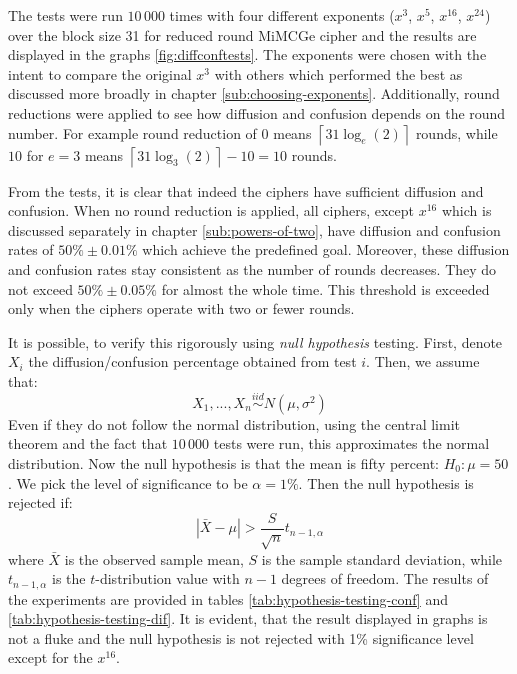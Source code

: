 \documentclass{Resources/UoBLab1}
\theoremstyle{definition}
\begin{document}
The tests were run $10\,000$ times with four different exponents ($x^3$, $x^5$, $x^{16}$, $x^{24}$) over the block size 31 for reduced round MiMCGe cipher and the results are displayed in the graphs \ref{fig:diffconftests}. The exponents were chosen with the intent to compare the original $x^3$ with others which performed the best as discussed more broadly in chapter \ref{sub:choosing-exponents}. Additionally, round reductions were applied to see how diffusion and confusion depends on the round number. For example round reduction of $0$ means $\left\lceil 31\log_e(2) \right\rceil$ rounds, while $10$ for $e = 3$ means \(\left\lceil 31\log_3(2) \right\rceil - 10 = 10\) rounds.

From the tests, it is clear that indeed the ciphers have sufficient diffusion and confusion. When no round reduction is applied, all ciphers, except $x^{16}$ which is discussed separately in chapter \ref{sub:powers-of-two}, have diffusion and confusion rates of $50\% \pm 0.01\%$ which achieve the predefined goal. Moreover, these diffusion and confusion rates stay consistent as the number of rounds decreases. They do not exceed $50\% \pm 0.05\%$ for almost the whole time. This threshold is exceeded only when the ciphers operate with two or fewer rounds.

It is possible, to verify this rigorously using \textit{null hypothesis} testing. First, denote $X_i$ the diffusion/confusion percentage obtained from test $i$. Then, we assume that:
\[
    X_1, ..., X_n \overset{iid}{\sim} N(\mu, \sigma^2)
\]
Even if they do not follow the normal distribution, using the central limit theorem and the fact that $10\,000$ tests were run, this approximates the normal distribution. Now the null hypothesis is that the mean is fifty percent: $H_0: \mu = 50$. We pick the level of significance to be $\alpha = 1\%$. Then the null hypothesis is rejected if:
\[
    |\bar{X} - \mu| > \frac{S}{\sqrt{n}}t_{n-1,\alpha}
\]
where $\bar{X}$ is the observed sample mean, $S$ is the sample standard deviation, while $t_{n-1,\alpha}$ is the $t$-distribution value with $n-1$ degrees of freedom. The results of the experiments are provided in tables \ref{tab:hypothesis-testing-conf} and \ref{tab:hypothesis-testing-dif}. It is evident, that the result displayed in graphs is not a fluke and the null hypothesis is not rejected with 1\% significance level except for the $x^{16}$.\medskip
\end{document}
